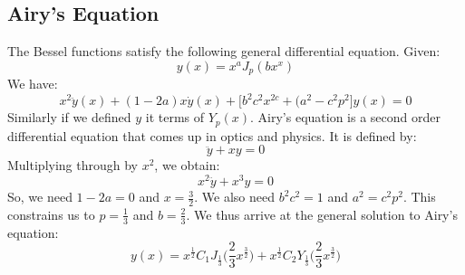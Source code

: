         \subsection{Airy's Equation}
            The Bessel functions satisfy the following
            general differential equation. Given:
            \begin{equation}
                y(x)=x^{a}J_{p}(bx^{x})
            \end{equation}
            We have:
            \begin{equation}
                x^{2}\ddot{y}(x)+(1-2a)x\dot{y}(x)+
                \Big[b^{2}c^{2}x^{2c}+(a^{2}-c^{2}p^{2}\Big]y(x)
                =0
            \end{equation}
            Similarly if we defined $y$ it terms of $Y_{p}(x)$.
            Airy's equation is a second order differential equation
            that comes up in optics and physics. It is defined by:
            \begin{equation}
                \ddot{y}+xy=0
            \end{equation}
            Multiplying through by $x^{2}$, we obtain:
            \begin{equation}
                x^{2}\ddot{y}+x^{3}y=0
            \end{equation}
            So, we need $1-2a=0$ and $x=\frac{3}{2}$. We also need
            $b^{2}c^{2}=1$ and $a^{2}=c^{2}p^{2}$. This constrains
            us to $p=\frac{1}{3}$ and $b=\frac{2}{3}$. We thus
            arrive at the general solution to Airy's equation:
            \begin{equation}
                y(x)=x^{\frac{1}{2}}C_{1}J_{\frac{1}{3}}
                    \Big(\frac{2}{3}x^{\frac{3}{2}}\Big)+
                    x^{\frac{1}{2}}C_{2}Y_{\frac{1}{3}}
                    \Big(\frac{2}{3}x^{\frac{3}{2}}\Big)
            \end{equation}
